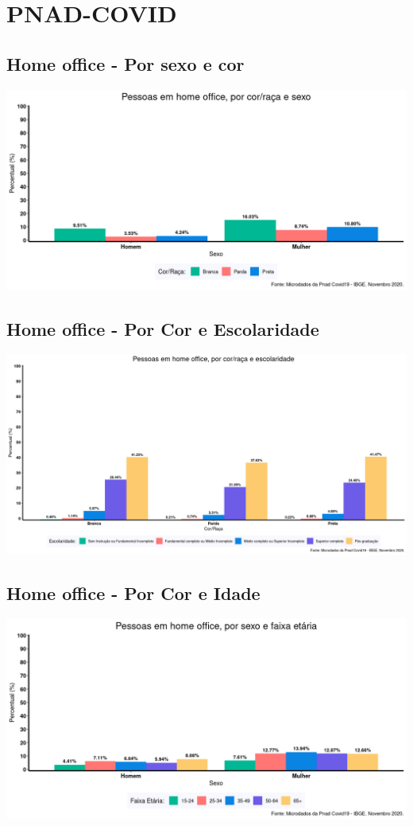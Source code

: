 \documentclass{SelfArx}
\begin{document}
\section*{PNAD-COVID}
\label{sec:orgf30fc82}
\subsection*{Home office - Por sexo e cor}
\label{sec:orgf6f0008}




\begin{center}
\includegraphics[width=.9\linewidth]{./figs/PNAD_COVID/home_sexo_cor.png}
\end{center}

\subsection*{Home office - Por Cor e Escolaridade}
\label{sec:org249d18a}
\begin{center}
\includegraphics[width=.9\linewidth]{./figs/PNAD_COVID/home_edu_cor.png}
\end{center}
\subsection*{Home office - Por Cor e Idade}
\label{sec:orgb793fbe}
\begin{center}
\includegraphics[width=.9\linewidth]{./figs/PNAD_COVID/home_sexo_idade.png}
\end{center}
\end{document}
